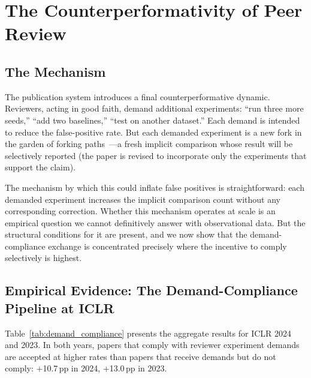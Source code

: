 \documentclass{article}
\begin{document}
\section{The Counterperformativity of Peer Review}
\label{sec:counterperformativity}

\subsection{The Mechanism}

The publication system introduces a final counterperformative dynamic. Reviewers, acting in good faith, demand additional experiments: ``run three more seeds,'' ``add two baselines,'' ``test on another dataset.'' Each demand is intended to reduce the false-positive rate. But each demanded experiment is a new fork in the garden of forking paths~\citep{gelman_garden_2013}---a fresh implicit comparison whose result will be selectively reported (the paper is revised to incorporate only the experiments that support the claim).

The mechanism by which this could inflate false positives is straightforward: each demanded experiment increases the implicit comparison count without any corresponding correction. Whether this mechanism operates at scale is an empirical question we cannot definitively answer with observational data. But the structural conditions for it are present, and we now show that the demand-compliance exchange is concentrated precisely where the incentive to comply selectively is highest.

\subsection{Empirical Evidence: The Demand-Compliance Pipeline at ICLR}

Table~\ref{tab:demand_compliance} presents the aggregate results for ICLR 2024 and 2023. In both years, papers that comply with reviewer experiment demands are accepted at higher rates than papers that receive demands but do not comply: $+$10.7\,pp in 2024, $+$13.0\,pp in 2023.
\end{document}
